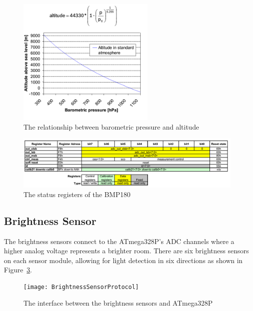 			\begin{figure}[h!]
				\centering
				\includegraphics[width=0.6\textwidth, angle=0]{BMP180altitude}
				\caption{The relationship between barometric pressure and altitude}
				\label{fig:BMP180altitude}
			\end{figure}
			
			\begin{figure}[h!]
				\centering
				\includegraphics[width=0.95\textheight, angle=90]{BMP180registers}
				\caption{The status registers of the BMP180}
				\label{fig:BMP180registers}
			\end{figure}
			
		
			\clearpage
		
		\subsection{Brightness Sensor}
			The brightness sensors connect to the ATmega328P's ADC channels where a higher analog voltage represents a brighter room. There are six brightness sensors on each sensor module, allowing for light detection in six directions as shown in Figure~\ref{fig:BrightnessSensorProtocol}.
			
			\begin{figure}[h!]
				\centering
				\texttt{[image: BrightnessSensorProtocol]}
				\caption{The interface between the brightness sensors and ATmega328P}
				\label{fig:BrightnessSensorProtocol}
			\end{figure}
			
